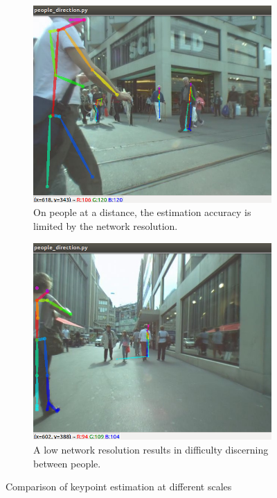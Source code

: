 \begin{figure}[ht]
\begin{subfigure}[b]{.32\textwidth}
        \includegraphics[width=1.0\linewidth]{img/chapter5_implementation/openposeKP1.png}
        \caption{On people at a distance, the estimation accuracy is limited by the network resolution.}
    \end{subfigure}
    \hspace{\fill} 
    \begin{subfigure}[b]{.32\textwidth}
        \centering
        \includegraphics[width=1.0\linewidth]{img/chapter5_implementation/openposeKP2.png}
        \caption{A low network resolution results in difficulty discerning between people.}
    \end{subfigure}
    \vspace{-1\baselineskip}
    \begin{center}
        \caption{Comparison of keypoint estimation at different scales}
        \label{fig:openposeKP}
    \end{center}
        \vspace{-1.5\baselineskip}
\end{figure}

